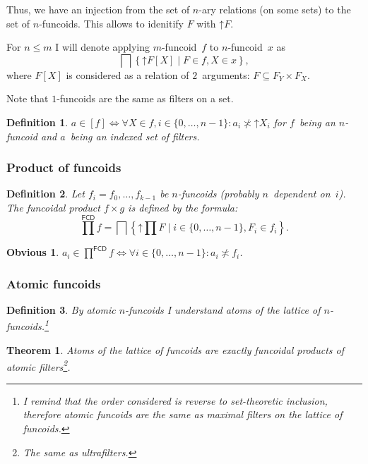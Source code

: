 \documentclass[oneside,draft]{amsart}
\newcommand{\setcond}[2]{\left\{#1\mid#2\right\}}
\newcommand{\intrs}{\not\asymp}
\newcommand{\funcoids}{\mathsf{FCD}}
\newcommand{\suprel}[1]{\left[#1\right]}
\newtheorem{thm}{Theorem}
\newtheorem{obvious}{Obvious}
\newtheorem{defn}{Definition}
\begin{document}
Thus, we have an injection from the set of $n$-ary relations (on some sets) to the set of $n$-fun\-co\-ids.
This allows to idenitify $F$ with $\mathord{\uparrow}F$.

For $n\leq m$ I will denote applying $m$-fun\-co\-id~$f$ to $n$-fun\-co\-id~$x$ as
\[ \bigsqcap\setcond{\mathord{\uparrow} F[X]}{F\in f,X\in x}, \]
where $F[X]$ is considered as a relation of $2$~arguments: $F\subseteq F_Y\times F_X$.

Note that $1$-fun\-co\-ids are the same as filters on a set.

\begin{defn}
$a\in\suprel{f} \Leftrightarrow \forall X\in f, i\in\{0,\dots,n-1\}: a_i \intrs \mathord{\uparrow}X_i$ for $f$~being an $n$-fun\-co\-id and $a$~being an indexed set of filters.
\end{defn}

\subsubsection{Product of funcoids}

\begin{defn}
Let $f_i = f_0,\dots,f_{k-1}$ be $n$-fun\-co\-ids (probably $n$~dependent on~$i$). The \emph{funcoidal product} $f\times g$ is defined by the formula:
\[
\prod^{\funcoids}f = \bigsqcap\setcond{\mathord{\uparrow}\prod F}{i\in\{0,\dots,n-1\}, F_i\in f_i}.
\]
\end{defn}

\begin{obvious}
$a_i\in\prod^{\funcoids}f \Leftrightarrow \forall i\in\{0,\dots,n-1\}: a_i\intrs f_i$.
\end{obvious}

\subsubsection{Atomic funcoids}

\begin{defn}
By \emph{atomic} $n$-fun\-co\-ids I understand atoms of the lattice of $n$-fun\-co\-ids.\footnote{I remind that the order considered is reverse to set-the\-o\-re\-tic inclusion, therefore atomic funcoids are the same as maximal filters on the lattice of funcoids.}
\end{defn}

\begin{thm}
Atoms of the lattice of funcoids are exactly funcoidal products of atomic filters\footnote{The same as ultrafilters.}.
\end{thm}
\end{document}

